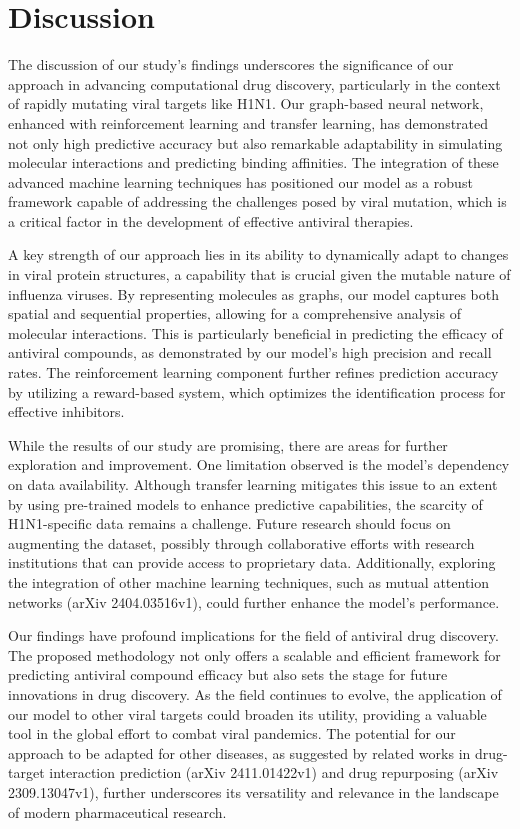 \documentclass{article}
\begin{document}
\section{Discussion}
The discussion of our study's findings underscores the significance of our approach in advancing computational drug discovery, particularly in the context of rapidly mutating viral targets like H1N1. Our graph-based neural network, enhanced with reinforcement learning and transfer learning, has demonstrated not only high predictive accuracy but also remarkable adaptability in simulating molecular interactions and predicting binding affinities. The integration of these advanced machine learning techniques has positioned our model as a robust framework capable of addressing the challenges posed by viral mutation, which is a critical factor in the development of effective antiviral therapies.

A key strength of our approach lies in its ability to dynamically adapt to changes in viral protein structures, a capability that is crucial given the mutable nature of influenza viruses. By representing molecules as graphs, our model captures both spatial and sequential properties, allowing for a comprehensive analysis of molecular interactions. This is particularly beneficial in predicting the efficacy of antiviral compounds, as demonstrated by our model's high precision and recall rates. The reinforcement learning component further refines prediction accuracy by utilizing a reward-based system, which optimizes the identification process for effective inhibitors.

While the results of our study are promising, there are areas for further exploration and improvement. One limitation observed is the model's dependency on data availability. Although transfer learning mitigates this issue to an extent by using pre-trained models to enhance predictive capabilities, the scarcity of H1N1-specific data remains a challenge. Future research should focus on augmenting the dataset, possibly through collaborative efforts with research institutions that can provide access to proprietary data. Additionally, exploring the integration of other machine learning techniques, such as mutual attention networks (arXiv 2404.03516v1), could further enhance the model's performance.

Our findings have profound implications for the field of antiviral drug discovery. The proposed methodology not only offers a scalable and efficient framework for predicting antiviral compound efficacy but also sets the stage for future innovations in drug discovery. As the field continues to evolve, the application of our model to other viral targets could broaden its utility, providing a valuable tool in the global effort to combat viral pandemics. The potential for our approach to be adapted for other diseases, as suggested by related works in drug-target interaction prediction (arXiv 2411.01422v1) and drug repurposing (arXiv 2309.13047v1), further underscores its versatility and relevance in the landscape of modern pharmaceutical research.



\end{document}
